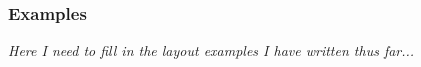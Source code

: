 
\subsubsection{Examples}
{\em Here I need to fill in the layout examples I have written thus far...}
